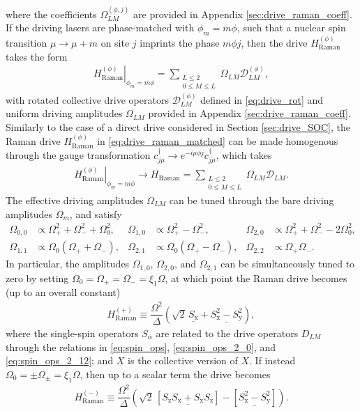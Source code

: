 \documentclass[nofootinbib,notitlepage,11pt]{revtex4-2}
\renewcommand{\t}{\text} %
\newcommand{\f}[2]{\dfrac{#1}{#2}} %
\newcommand{\p}[1]{\left(#1\right)} %
\renewcommand{\sp}[1]{\left[#1\right]} %
\newcommand{\1}{\mathds{1}}
\newcommand{\x}{\text{x}}
\newcommand{\y}{\text{y}}
\newcommand{\z}{\text{z}}
\newcommand{\D}{\mathcal{D}}
\newcommand{\col}{\underline}
\begin{document}
where the coefficients $\Omega_{LM}^{(\phi,j)}$ are provided in
Appendix \ref{sec:drive_raman_coeff}.  If the driving lasers are
phase-matched with $\phi_m=m\phi$, such that a nuclear spin transition
$\mu\to\mu+m$ on site $j$ imprints the phase $m\phi j$, then the drive
$H_{\t{Raman}}^{(\phi)}$ takes the form
\begin{align}
  \left. H_{\t{Raman}}^{(\phi)} \right|_{\phi_m=m\phi}
  = \sum_{\substack{L\le2\\0\le M\le L}}
  \Omega_{LM} \D_{LM}^{(\phi)},
  \label{eq:drive_raman_matched}
\end{align}
with rotated collective drive operators $\D_{LM}^{(\phi)}$ defined in
\eqref{eq:drive_rot} and uniform driving amplitudes $\Omega_{LM}$
provided in Appendix \ref{sec:drive_raman_coeff}.  Similarly to the
case of a direct drive considered in Section \ref{sec:drive_SOC}, the
Raman drive $H_{\t{Raman}}^{(\phi)}$ in \eqref{eq:drive_raman_matched}
can be made homogenous through the gauge transformation
$c_{j\mu}^\dag \to e^{-i\mu\phi j} c_{j\mu}^\dag$, which takes
\begin{align}
  \left. H_{\t{Raman}}^{(\phi)} \right|_{\phi_m=m\phi}
  \to H_{\t{Raman}}
  = \sum_{\substack{L\le2\\0\le M\le L}} \Omega_{LM} \D_{LM}.
\end{align}
The effective driving amplitudes $\Omega_{LM}$ can be tuned through
the bare driving amplitudes $\Omega_m$, and satisfy
\begin{align}
  \Omega_{0,0} &\propto \Omega_+^2 + \Omega_-^2 + \Omega_0^2,
  &
  \Omega_{1,0} &\propto \Omega_+^2 - \Omega_-^2,
  &
  \Omega_{2,0} &\propto \Omega_+^2 + \Omega_-^2 - 2\Omega_0^2,
  \\
  \Omega_{1,1} &\propto \Omega_0 \p{\Omega_+ + \Omega_-},
  &
  \Omega_{2,1} &\propto \Omega_0 \p{\Omega_+ - \Omega_-},
  &
  \Omega_{2,2} &\propto \Omega_+ \Omega_-.
\end{align}
In particular, the amplitudes $\Omega_{1,0}$, $\Omega_{2,0}$, and
$\Omega_{2,1}$ can be simultaneously tuned to zero by setting
$\Omega_0=\Omega_+=\Omega_-=\xi_1\Omega$, at which point the Raman
drive becomes (up to an overall constant)
\begin{align}
  H_{\t{Raman}}^{(+)} \equiv \f{\Omega^2}{\Delta}
  \p{\sqrt{2}\, \col{S_\x} + \col{S_\x^2 - S_\y^2}},
\end{align}
where the single-spin operators $S_\alpha$ are related to the drive
operators $D_{LM}$ through the relations in \eqref{eq:spin_ops},
\eqref{eq:spin_ops_2_0}, and \eqref{eq:spin_ops_2_12}; and $\col{X}$
is the collective version of $X$.  If instead
$\Omega_0=\pm\Omega_\pm=\xi_1\Omega$, then up to a scalar term the
drive becomes
\begin{align}
  H_{\t{Raman}}^{(-)} \equiv \f{\Omega^2}{\Delta}
  \p{\sqrt{2}\, \sp{\col{S_\z S_\x+ S_\x S_\z}}
    - \sp{\col{S_\x^2 - S_\y^2}}}.
\end{align}
\end{document}
